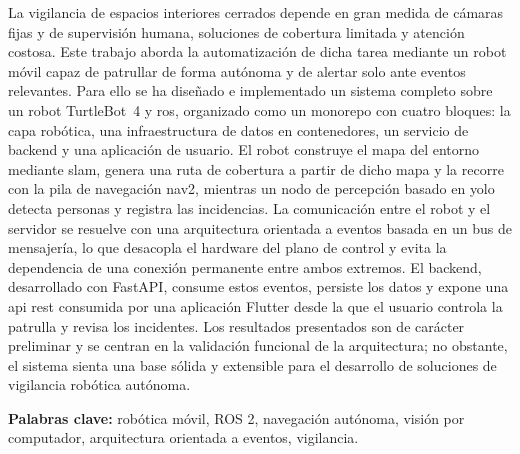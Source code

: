 La vigilancia de espacios interiores cerrados depende en gran medida de cámaras
fijas y de supervisión humana, soluciones de cobertura limitada y atención
costosa. Este trabajo aborda la automatización de dicha tarea mediante un robot
móvil capaz de patrullar de forma autónoma y de alertar solo ante eventos
relevantes. Para ello se ha diseñado e implementado un sistema completo sobre un
robot \mbox{TurtleBot~4} y \gls{ros}, organizado como un monorepo con cuatro
bloques: la capa robótica, una infraestructura de datos en contenedores, un
servicio de backend y una aplicación de usuario. El robot construye el mapa del
entorno mediante \gls{slam}, genera una ruta de cobertura a partir de dicho mapa
y la recorre con la pila de navegación \gls{nav2}, mientras un nodo de percepción
basado en \gls{yolo} detecta personas y registra las incidencias. La
comunicación entre el robot y el servidor se resuelve con una arquitectura
orientada a eventos basada en un bus de mensajería, lo que desacopla el hardware
del plano de control y evita la dependencia de una conexión permanente entre ambos
extremos. El backend, desarrollado con
FastAPI, consume estos eventos, persiste los datos y expone una \gls{api}
\gls{rest} consumida por una aplicación \mbox{Flutter} desde la que el usuario
controla la patrulla y revisa los incidentes. Los resultados presentados son de
carácter preliminar y se centran en la validación funcional de la arquitectura;
no obstante, el sistema sienta una base sólida y extensible para el desarrollo de
soluciones de vigilancia robótica autónoma.

\textbf{Palabras clave:} robótica móvil, ROS 2, navegación autónoma, visión por
computador, arquitectura orientada a eventos, vigilancia.

\cleardoublepage
